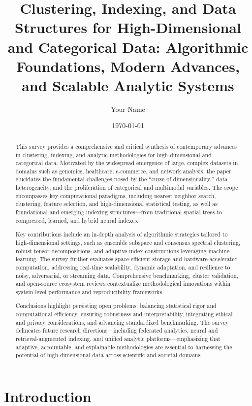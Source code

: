\documentclass[11pt]{article}
\begin{document}
\author{Your Name}
\date{\today}

\title{\title{Clustering, Indexing, and Data Structures for High-Dimensional and Categorical Data: Algorithmic Foundations, Modern Advances, and Scalable Analytic Systems}}
\maketitle

\begin{abstract}
This survey provides a comprehensive and critical synthesis of contemporary advances in clustering, indexing, and analytic methodologies for high-dimensional and categorical data. Motivated by the widespread emergence of large, complex datasets in domains such as genomics, healthcare, e-commerce, and network analysis, the paper elucidates the fundamental challenges posed by the “curse of dimensionality,” data heterogeneity, and the proliferation of categorical and multimodal variables. The scope encompasses key computational paradigms, including nearest neighbor search, clustering, feature selection, and high-dimensional statistical testing, as well as foundational and emerging indexing structures—from traditional spatial trees to compressed, learned, and hybrid neural indexes.

Key contributions include an in-depth analysis of algorithmic strategies tailored to high-dimensional settings, such as ensemble subspace and consensus spectral clustering, robust tensor decompositions, and adaptive index constructions leveraging machine learning. The survey further evaluates space-efficient storage and hardware-accelerated computation, addressing real-time scalability, dynamic adaptation, and resilience to noisy, adversarial, or streaming data. Comprehensive benchmarking, cluster validation, and open-source ecosystem reviews contextualize methodological innovations within system-level performance and reproducibility frameworks.

Conclusions highlight persisting open problems: balancing statistical rigor and computational efficiency, ensuring robustness and interpretability, integrating ethical and privacy considerations, and advancing standardized benchmarking. The survey delineates future research directions—including federated analytics, neural and retrieval-augmented indexing, and unified analytic platforms—emphasizing that adaptive, accountable, and explainable methodologies are essential to harnessing the potential of high-dimensional data across scientific and societal domains.
\end{abstract}\section{Introduction}
\end{document}
